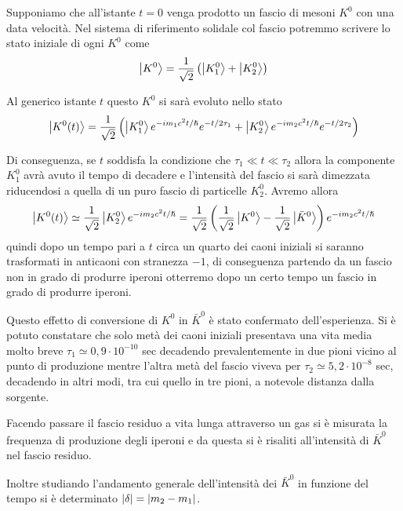 Supponiamo che all'istante $t=0$ venga prodotto un fascio di mesoni $K^0$ con
una  data velocità. Nel sistema di riferimento solidale col fascio potremmo
scrivere lo stato iniziale di ogni $K^0$ come
\[
  \Ket{K^0} = \frac{1}{\sqrt{2}}\left( \Ket{K_1^0} + \Ket{K_2^0} \right)
\]

Al generico istante $t$ questo $K^0$ si sarà evoluto nello stato
\[
  \Ket{K^0(t)} = \frac{1}{\sqrt{2}}\left(
  \Ket{K_1^0}e^{-im_1c^2t/\hslash}e^{-t/2\tau_1}+\Ket{K_2^0}e^{-im_2c^2t/\hslash}e^{-t/2\tau_2} \right)
\]

Di conseguenza, se $t$ soddisfa la condizione che $\tau_1\ll t\ll\tau_2$ allora
la componente $K_1^0$ avrà avuto il tempo di decadere e l'intensità del fascio
si sarà dimezzata riducendosi a quella di un puro fascio di particelle $K_2^0$.
Avremo allora
\[
  \Ket{K^0(t)}\simeq \frac{1}{\sqrt{2}}\Ket{K_2^0}e^{-im_2c^2t/\hslash} =
  \frac{1}{\sqrt{2}}\left( \frac{1}{\sqrt{2}}\Ket{K^0} -
  \frac{1}{\sqrt{2}}\Ket{\bar{K}^0} \right)e^{-im_2c^2t/\hslash}
\]
quindi dopo un tempo pari a $t$ circa un quarto dei caoni iniziali si saranno
trasformati in anticaoni con stranezza  $-1$, di conseguenza partendo da un
fascio non in grado di produrre iperoni otterremo dopo un certo tempo un fascio
in grado di produrre iperoni.

Questo effetto di conversione di $K^0$ in $\bar{K}^0$ è stato confermato
dell'esperienza. Si è potuto constatare che solo metà dei caoni iniziali
presentava una vita media molto breve $\tau_1\simeq 0,9\cdot 10^{-10}$ sec
decadendo prevalentemente in due pioni vicino al punto di produzione mentre
l'altra metà del fascio viveva per $\tau_2\simeq 5,2\cdot 10^{-8}$ sec,
decadendo in altri modi, tra cui quello in tre pioni, a notevole distanza dalla
sorgente.

Facendo passare il fascio residuo a vita lunga attraverso un gas si è misurata
la frequenza di produzione degli iperoni e da questa si è risaliti all'intensità
di $\bar{K}^0$ nel fascio residuo.

Inoltre studiando l'andamento generale dell'intensità dei $\bar{K}^0$ in
funzione del tempo si è determinato $\left| \delta \right| = \left| m_2-m_1 \right|$.

